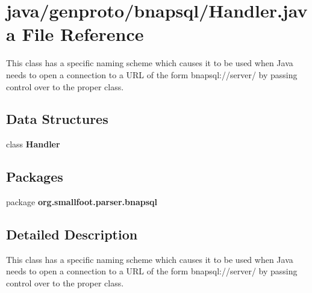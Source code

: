 \section{java/genproto/bnapsql/\+Handler.java File Reference}
\label{bnapsql_2Handler_8java}


This class has a specific naming scheme which causes it to be used when Java needs to open a connection to a U\+R\+L of the form bnapsql\+://server/ by passing control over to the proper class.  


\subsection*{Data Structures}
\begin{DoxyCompactItemize}
\item 
class {\bf Handler}
\end{DoxyCompactItemize}
\subsection*{Packages}
\begin{DoxyCompactItemize}
\item 
package {\bf org.\+smallfoot.\+parser.\+bnapsql}
\end{DoxyCompactItemize}


\subsection{Detailed Description}
This class has a specific naming scheme which causes it to be used when Java needs to open a connection to a U\+R\+L of the form bnapsql\+://server/ by passing control over to the proper class. 

